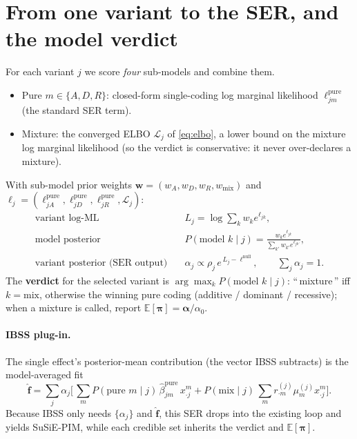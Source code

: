 \documentclass[11pt]{article}
\newcommand{\E}{\mathbb{E}}
\begin{document}
\section{From one variant to the SER, and the model verdict}
For each variant $j$ we score \emph{four} sub-models and combine them.
\begin{itemize}\itemsep1pt
\item Pure $m\in\{A,D,R\}$: closed-form single-coding log marginal likelihood
$\ell^{\mathrm{pure}}_{jm}$ (the standard SER term).
\item Mixture: the converged ELBO $\mathcal L_j$ of \eqref{eq:elbo}, a lower bound
on the mixture log marginal likelihood (so the verdict is conservative: it never
over-declares a mixture).
\end{itemize}
With sub-model prior weights $\bm w=(w_A,w_D,w_R,w_{\mathrm{mix}})$ and
$\bm\ell_j=(\ell^{\mathrm{pure}}_{jA},\ell^{\mathrm{pure}}_{jD},\ell^{\mathrm{pure}}_{jR},\mathcal L_j)$:
\begin{align}
\text{variant log-ML}\quad & L_j=\log\!\textstyle\sum_k w_k e^{\ell_{jk}},\\
\text{model posterior}\quad & P(\text{model }k\mid j)=\frac{w_k e^{\ell_{jk}}}{\sum_{k'}w_{k'}e^{\ell_{jk'}}},\\
\text{variant posterior (SER output)}\quad & \alpha_j\propto \rho_j\,e^{\,L_j-\ell^{\mathrm{null}}},\qquad \textstyle\sum_j\alpha_j=1 .
\label{eq:ser}
\end{align}
The \textbf{verdict} for the selected variant is $\arg\max_k P(\text{model }k\mid j)$:
``\,mixture\,'' iff $k=\mathrm{mix}$, otherwise the winning pure coding
(additive / dominant / recessive); when a mixture is called, report
$\E[\bm\pi]=\bm\alpha/\alpha_0$.

\paragraph{IBSS plug-in.} The single effect's posterior-mean contribution
(the vector IBSS subtracts) is the model-averaged fit
\begin{equation}
\widehat{\bm f}=\sum_j \alpha_j\Big[\,\sum_{m}P(\text{pure }m\mid j)\,\hat\beta^{\mathrm{pure}}_{jm}\,x^m_{\cdot j}
+P(\mathrm{mix}\mid j)\,\textstyle\sum_m r^{(j)}_{\cdot m}\mu^{(j)}_m x^m_{\cdot j}\Big].
\end{equation}
Because IBSS only needs $\{\alpha_j\}$ and $\widehat{\bm f}$, this SER drops into
the existing loop and yields SuSiE-PIM, while each credible set inherits the
verdict and $\E[\bm\pi]$.
\end{document}
